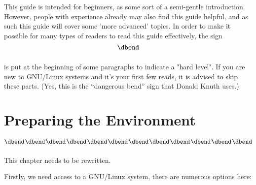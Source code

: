 \documentclass{extbook}
\begin{document}
This guide is intended for beginners, as some sort of a semi-gentle introduction. However, people with experience already may also find this guide helpful, and as such this guide will cover some 'more advanced' topics. In order to make it possible for many types of readers to read this guide effectively, the  sign
$$\vbox{\hbox{\dbend}\vskip 11pt}$$
is put at the beginning of some paragraphs to indicate a "hard level". If you are new to GNU/Linux systems and it's your first few reads, it is advised to skip these parts. (Yes, this is the ``{dangerous bend}'' sign that Donald Knuth uses.)

\tableofcontents

\mainmatter
\chapter{Preparing the Environment}

$$\vcenter{\hbox{\dbend\kern1pt\dbend\kern1pt\dbend\kern1pt\dbend\kern1pt\dbend\kern1pt\dbend\kern1pt\dbend\kern1pt\dbend\kern1pt\dbend\kern1pt\dbend\kern1pt\dbend\kern1pt\dbend}\vskip 11pt}$$
This chapter needs to be rewritten.

Firstly, we need access to a GNU/Linux system, there are numerous options here:
\end{document}
